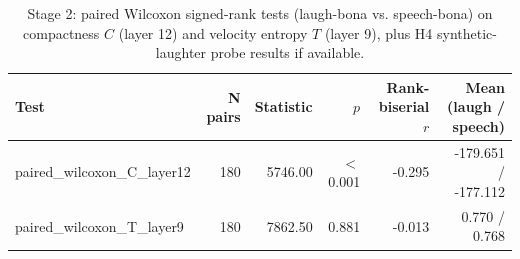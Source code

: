 \begin{table}[t]
\centering
\caption{Stage 2: paired Wilcoxon signed-rank tests (laugh-bona vs. speech-bona) on compactness $C$ (layer 12) and velocity entropy $T$ (layer 9), plus H4 synthetic-laughter probe results if available.}
\label{tab:table2}
\begin{tabular}{lrrrrr}
\toprule
Test & N pairs & Statistic & $p$ & Rank-biserial $r$ & Mean (laugh / speech) \\
\midrule
paired\_wilcoxon\_C\_layer12 & 180 & 5746.00 & $<$0.001 & -0.295 & -179.651 / -177.112 \\
paired\_wilcoxon\_T\_layer9 & 180 & 7862.50 & 0.881 & -0.013 & 0.770 / 0.768 \\
\bottomrule
\end{tabular}
\end{table}
